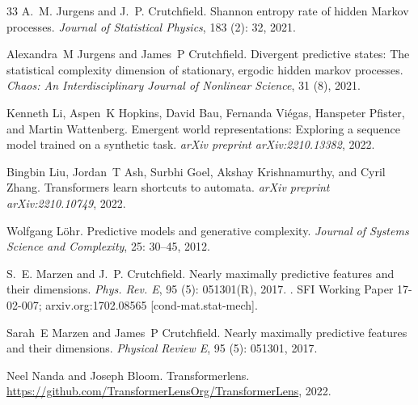 \documentclass{article}
\begin{document}
\begin{thebibliography}{33}
A.~M. Jurgens and J.~P. Crutchfield.
\newblock Shannon entropy rate of hidden {M}arkov processes.
\newblock \emph{Journal of Statistical Physics}, 183 (2): 32, 2021{}.

Alexandra~M Jurgens and James~P Crutchfield.
\newblock Divergent predictive states: The statistical complexity dimension of stationary, ergodic hidden markov processes.
\newblock \emph{Chaos: An Interdisciplinary Journal of Nonlinear Science}, 31 (8), 2021{}.

Kenneth Li, Aspen~K Hopkins, David Bau, Fernanda Vi{\'e}gas, Hanspeter Pfister, and Martin Wattenberg.
\newblock Emergent world representations: Exploring a sequence model trained on a synthetic task.
\newblock \emph{arXiv preprint arXiv:2210.13382}, 2022.

Bingbin Liu, Jordan~T Ash, Surbhi Goel, Akshay Krishnamurthy, and Cyril Zhang.
\newblock Transformers learn shortcuts to automata.
\newblock \emph{arXiv preprint arXiv:2210.10749}, 2022.

Wolfgang L{\"o}hr.
\newblock Predictive models and generative complexity.
\newblock \emph{Journal of Systems Science and Complexity}, 25: 30--45, 2012.

S.~E. Marzen and J.~P. Crutchfield.
\newblock Nearly maximally predictive features and their dimensions.
\newblock \emph{Phys. Rev. E}, 95 (5): 051301(R), 2017{}.
\newblock {}.
\newblock SFI Working Paper 17-02-007; arxiv.org:1702.08565 [cond-mat.stat-mech].

Sarah~E Marzen and James~P Crutchfield.
\newblock Nearly maximally predictive features and their dimensions.
\newblock \emph{Physical Review E}, 95 (5): 051301, 2017{}.

Neel Nanda and Joseph Bloom.
\newblock Transformerlens.
\newblock \url{https://github.com/TransformerLensOrg/TransformerLens}, 2022.


\end{thebibliography}
\end{document}
